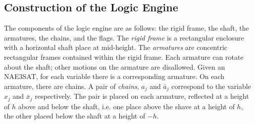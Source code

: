 \subsection{Construction of the Logic Engine}
The components of the logic engine are as follows: the rigid frame, the shaft, the armatures, 
the chains, and the flags.  The \textit{rigid frame} is a rectangular enclosure with a horizontal 
shaft place at mid-height.  The \textit{armatures} are concentric rectangular frames contained 
within the rigid frame.  Each armature can rotate about the shaft; other motions on the armature 
are disallowed.  Given an NAE3SAT, for each variable there is a corresponding armature. On each 
armature, there are chains.  A pair of \textit{chains}, $a_j$ and $\bar{a}_j$ correspond to the 
variable $x_j$ and $\bar{x}_j$ respectively.  The pair is placed on each armature, reflected at a 
height of $h$ above and below the shaft, i.e. one place above the shave at a height of $h$, the 
other placed below the shaft at a height of $-h$.

